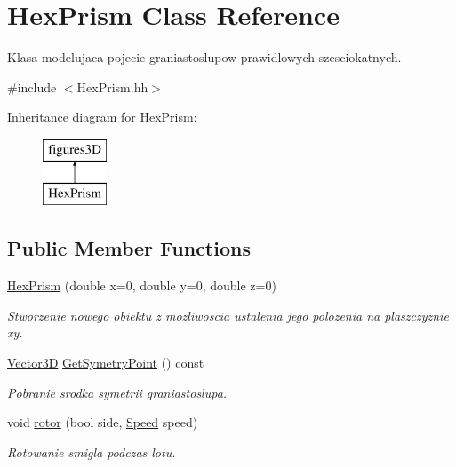 \hypertarget{class_hex_prism}{}\section{Hex\+Prism Class Reference}
\label{class_hex_prism}


Klasa modelujaca pojecie graniastoslupow prawidlowych szesciokatnych.  




{\ttfamily \#include $<$Hex\+Prism.\+hh$>$}

Inheritance diagram for Hex\+Prism\+:\begin{figure}[H]
\begin{center}
\leavevmode
\includegraphics[height=2.000000cm]{class_hex_prism}
\end{center}
\end{figure}
\subsection*{Public Member Functions}
\begin{DoxyCompactItemize}
\item 
\hyperlink{class_hex_prism_a8360fd46ae716c1f5ba97f3213c3d223}{Hex\+Prism} (double x=0, double y=0, double z=0)
\begin{DoxyCompactList}\small\item\em Stworzenie nowego obiektu z mozliwoscia ustalenia jego polozenia na plaszczyznie xy. \end{DoxyCompactList}\item 
\hyperlink{vector3_d_8hh_a8790ef07836c1639da216f46501979c0}{Vector3D} \hyperlink{class_hex_prism_a9684bd167a9dcd710dbe227704bcb786}{Get\+Symetry\+Point} () const 
\begin{DoxyCompactList}\small\item\em Pobranie srodka symetrii graniastoslupa. \end{DoxyCompactList}\item 
void \hyperlink{class_hex_prism_a7d4bf4b9176fbb01146e74875d780626}{rotor} (bool side, \hyperlink{_hex_prism_8hh_ad57b3fa8e45359906ac229567c209a63}{Speed} speed)
\begin{DoxyCompactList}\small\item\em Rotowanie smigla podczas lotu. \end{DoxyCompactList}\end{DoxyCompactItemize}
